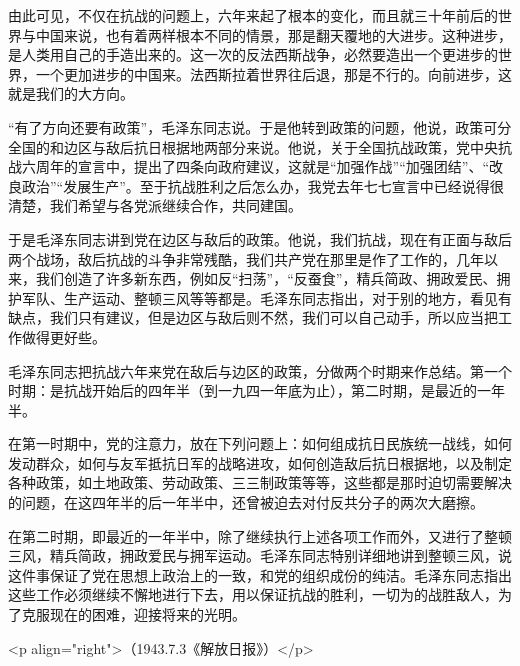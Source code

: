 由此可见，不仅在抗战的问题上，六年来起了根本的变化，而且就三十年前后的世界与中国来说，也有着两样根本不同的情景，那是翻天覆地的大进步。这种进步，是人类用自己的手造出来的。这一次的反法西斯战争，必然要造出一个更进步的世界，一个更加进步的中国来。法西斯拉着世界往后退，那是不行的。向前进步，这就是我们的大方向。

“有了方向还要有政策”，毛泽东同志说。于是他转到政策的问题，他说，政策可分全国的和边区与敌后抗日根据地两部分来说。他说，关于全国抗战政策，党中央抗战六周年的宣言中，提出了四条向政府建议，这就是“加强作战”“加强团结”、“改良政治”“发展生产”。至于抗战胜利之后怎么办，我党去年七七宣言中已经说得很清楚，我们希望与各党派继续合作，共同建国。

于是毛泽东同志讲到党在边区与敌后的政策。他说，我们抗战，现在有正面与敌后两个战场，敌后抗战的斗争非常残酷，我们共产党在那里是作了工作的，几年以来，我们创造了许多新东西，例如反“扫荡”，“反蚕食”，精兵简政、拥政爱民、拥护军队、生产运动、整顿三风等等都是。毛泽东同志指出，对于别的地方，看见有缺点，我们只有建议，但是边区与敌后则不然，我们可以自己动手，所以应当把工作做得更好些。

毛泽东同志把抗战六年来党在敌后与边区的政策，分做两个时期来作总结。第一个时期：是抗战开始后的四年半（到一九四一年底为止），第二时期，是最近的一年半。

在第一时期中，党的注意力，放在下列问题上：如何组成抗日民族统一战线，如何发动群众，如何与友军抵抗日军的战略进攻，如何创造敌后抗日根据地，以及制定各种政策，如土地政策、劳动政策、三三制政策等等，这些都是那时迫切需要解决的问题，在这四年半的后一年半中，还曾被迫去对付反共分子的两次大磨擦。

在第二时期，即最近的一年半中，除了继续执行上述各项工作而外，又进行了整顿三风，精兵简政，拥政爱民与拥军运动。毛泽东同志特别详细地讲到整顿三风，说这件事保证了党在思想上政治上的一致，和党的组织成份的纯洁。毛泽东同志指出这些工作必须继续不懈地进行下去，用以保证抗战的胜利，一切为的战胜敌人，为了克服现在的困难，迎接将来的光明。

<p align="right">（1943.7.3《解放日报》）</p>

